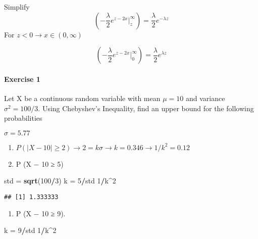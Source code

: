 \documentclass[
]{article}
\newenvironment{Shaded}{\begin{snugshade}}{\end{snugshade}}
\newcommand{\DecValTok}[1]{\textcolor[rgb]{0.00,0.00,0.81}{#1}}
\newcommand{\KeywordTok}[1]{\textcolor[rgb]{0.13,0.29,0.53}{\textbf{#1}}}
\newcommand{\NormalTok}[1]{#1}
\newcommand{\OperatorTok}[1]{\textcolor[rgb]{0.81,0.36,0.00}{\textbf{#1}}}
\newcommand{\StringTok}[1]{\textcolor[rgb]{0.31,0.60,0.02}{#1}}
\providecommand{\tightlist}{%
  \setlength{\itemsep}{0pt}\setlength{\parskip}{0pt}}
\begin{document}
Simplify
\[(-\frac{\lambda}{2}e^ {z - 2x}|_z^{\infty}) = \frac{\lambda}{2}e^{-\lambda z}\]
For \(z < 0 \rightarrow x \in (0 , \infty)\)

\[(-\frac{\lambda}{2}e^ {z - 2x}|_0^{\infty}) = \frac{\lambda}{2}e^{\lambda z}\]

\hypertarget{exercise-1}{%
\paragraph{Exercise 1}\label{exercise-1}}

Let X be a continuous random variable with mean \(\mu = 10\) and
variance \(σ^2 = 100/3\). Using Chebyshev's Inequality, find an upper
bound for the following probabilities

\(\sigma = 5.77\)

\begin{enumerate}
\def\labelenumi{(\alph{enumi})}
\item
  \(P (|X − 10| ≥ 2) \rightarrow 2 = k\sigma \rightarrow k=0.346 \rightarrow 1/k^2 = 0.12\)
\item
  P (\textbar X − 10\textbar{} ≥ 5)
\end{enumerate}

\begin{Shaded}
\begin{Highlighting}[]
\NormalTok{std =}\StringTok{ }\KeywordTok{sqrt}\NormalTok{(}\DecValTok{100}\OperatorTok{/}\DecValTok{3}\NormalTok{)}
\NormalTok{k =}\StringTok{ }\DecValTok{5}\OperatorTok{/}\NormalTok{std}
\DecValTok{1}\OperatorTok{/}\NormalTok{k}\OperatorTok{^}\DecValTok{2}
\end{Highlighting}
\end{Shaded}

\begin{verbatim}
## [1] 1.333333
\end{verbatim}

\begin{enumerate}
\def\labelenumi{(\alph{enumi})}
\setcounter{enumi}{2}
\tightlist
\item
  P (\textbar X − 10\textbar{} ≥ 9).
\end{enumerate}

\begin{Shaded}
\begin{Highlighting}[]
\NormalTok{k =}\StringTok{ }\DecValTok{9}\OperatorTok{/}\NormalTok{std}
\DecValTok{1}\OperatorTok{/}\NormalTok{k}\OperatorTok{^}\DecValTok{2}
\end{Highlighting}
\end{Shaded}
\end{document}
